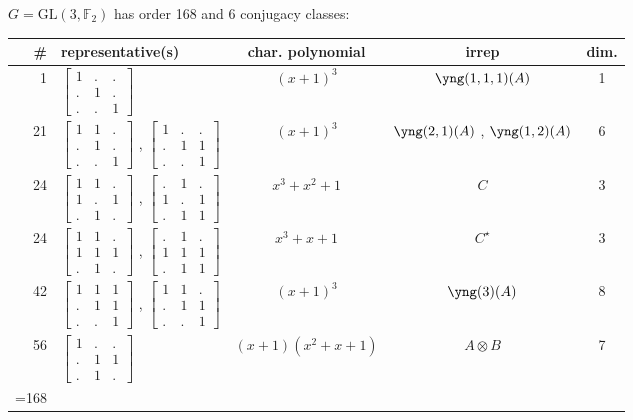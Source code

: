 \documentclass[11pt,oneside]{article}
\newcommand{\GL}{\mathrm{GL}}
\newcommand{\Field}{\mathbb{F}}
\newcommand{\tensor}{\otimes}
\begin{document}
$G=\GL(3,\Field_2)$ has order 168 and 6 conjugacy classes:
\begin{center}
\begin{tabular}{r|l|c|c|c}
\# & representative(s) & char. polynomial & irrep & dim. \\
\hline
 1 & $\begin{bmatrix}1&.&.\\.&1&.\\.&.&1\end{bmatrix}$ & $(x+1)^3$  
    & $\yng(1,1,1)(A)$ & 1 \\
21 & $\begin{bmatrix}1&1&.\\.&1&.\\.&.&1\end{bmatrix}$ ,
     $\begin{bmatrix}1&.&.\\.&1&1\\.&.&1\end{bmatrix}$ & $(x+1)^3$  
    & $\yng(2,1)(A)$ , $\yng(1,2)(A)$ & 6  \\
24 & 
$\begin{bmatrix}1&1&.\\1&.&1\\.&1&.\end{bmatrix}$
,
$\begin{bmatrix}.&1&.\\1&.&1\\.&1&1\end{bmatrix}$
& $x^3+x^2+1$      & $C$ & 3 \\
24 & 
$\begin{bmatrix}1&1&.\\1&1&1\\.&1&.\end{bmatrix}$
,
$\begin{bmatrix}.&1&.\\1&1&1\\.&1&1\end{bmatrix}$
& $x^3+x+1$        & $C^{\star}$ & 3 \\
42 & $\begin{bmatrix}1&1&1\\.&1&1\\.&.&1\end{bmatrix}$
    ,  $\begin{bmatrix}1&1&.\\.&1&1\\.&.&1\end{bmatrix}$
    & $(x+1)^3$ 
    & $\yng(3)(A)$ & 8  \\
56 & $\begin{bmatrix}1&.&.\\.&1&1\\.&1&.\end{bmatrix}$ & $(x+1)(x^2+x+1)$
    & $A\tensor B$ & 7 \\
\hline
\strut =168 \\
\end{tabular}
\end{center}
\end{document}
